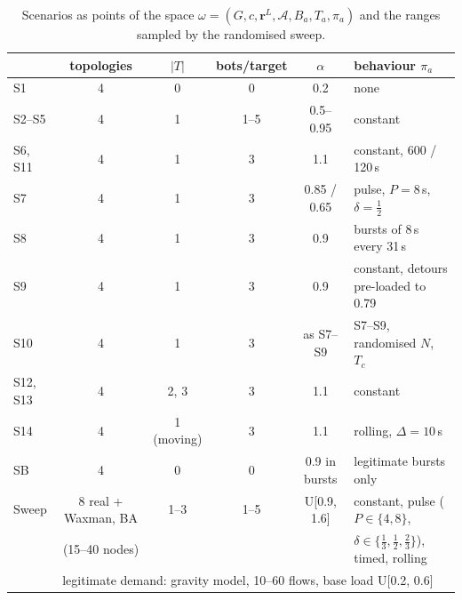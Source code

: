 \begin{table}[t]\centering\scriptsize
\caption{Scenarios as points of the space $\omega=(G,c,\mathbf{r}^L,\mathcal{A},B_a,T_a,\pi_a)$ and the
ranges sampled by the randomised sweep.}\label{tab:scenario_space}
\setlength{\tabcolsep}{2.5pt}
\begin{tabular}{@{}lccccl@{}}
\toprule
 & topologies & $|T|$ & bots/target & $\alpha$ & behaviour $\pi_a$\\
\midrule
S1 & 4 & 0 & 0 & 0.2 & none\\
S2--S5 & 4 & 1 & 1--5 & 0.5--0.95 & constant\\
S6, S11 & 4 & 1 & 3 & 1.1 & constant, 600 / 120\,s\\
S7 & 4 & 1 & 3 & 0.85 / 0.65 & pulse, $P=8$\,s, $\delta=\tfrac12$\\
S8 & 4 & 1 & 3 & 0.9 & bursts of 8\,s every 31\,s\\
S9 & 4 & 1 & 3 & 0.9 & constant, detours pre-loaded to 0.79\\
S10 & 4 & 1 & 3 & as S7--S9 & S7--S9, randomised $N$, $T_c$\\
S12, S13 & 4 & 2, 3 & 3 & 1.1 & constant\\
S14 & 4 & 1 (moving) & 3 & 1.1 & rolling, $\Delta=10$\,s\\
SB & 4 & 0 & 0 & 0.9 in bursts & legitimate bursts only\\
\midrule
Sweep & 8 real + Waxman, BA & 1--3 & 1--5 & U[0.9, 1.6] & constant, pulse ($P\in\{4,8\}$,\\
 & (15--40 nodes) & & & & $\delta\in\{\tfrac13,\tfrac12,\tfrac23\}$), timed, rolling\\
 & \multicolumn{5}{l}{legitimate demand: gravity model, 10--60 flows, base load U[0.2, 0.6]}\\
\bottomrule
\end{tabular}
\end{table}
